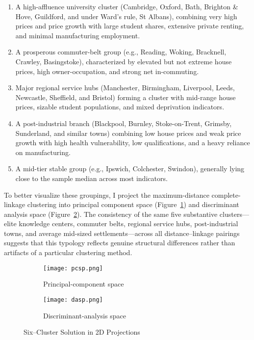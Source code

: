 \documentclass[12pt]{article}
\begin{document}
\begin{enumerate}
    \item A high-affluence university cluster (Cambridge, Oxford, Bath, Brighton \& Hove, Guildford, and under Ward’s rule, St Albans), combining very high prices and price growth with large student shares, extensive private renting, and minimal manufacturing employment.  
    \item A prosperous commuter-belt group (e.g., Reading, Woking, Bracknell, Crawley, Basingstoke), characterized by elevated but not extreme house prices, high owner-occupation, and strong net in-commuting.  
    \item Major regional service hubs (Manchester, Birmingham, Liverpool, Leeds, Newcastle, Sheffield, and Bristol) forming a cluster with mid-range house prices, sizable student populations, and mixed deprivation indicators.  
    \item A post-industrial branch (Blackpool, Burnley, Stoke-on-Trent, Grimsby, Sunderland, and similar towns) combining low house prices and weak price growth with high health vulnerability, low qualifications, and a heavy reliance on manufacturing. 
    \item A mid-tier stable group (e.g., Ipswich, Colchester, Swindon), generally lying close to the sample median across most indicators.
\end{enumerate}

To better visualize these groupings, I project the maximum-distance complete-linkage clustering into principal component space (Figure~\ref{fig:pcspace}) and discriminant analysis space (Figure~\ref{fig:daspace}). The consistency of the same five substantive clusters—elite knowledge centers, commuter belts, regional service hubs, post-industrial towns, and average mid-sized settlements—across all distance–linkage pairings suggests that this typology reflects genuine structural differences rather than artifacts of a particular clustering method.

\begin{figure}[htbp]
    \centering
    \begin{subfigure}[b]{0.49\textwidth}
        \centering
        \texttt{[image: pcsp.png]}
        \caption{Principal-component space\label{fig:pcspace}}
    \end{subfigure}
    \begin{subfigure}[b]{0.49\textwidth}
        \centering
        \texttt{[image: dasp.png]}
        \caption{Discriminant-analysis space\label{fig:daspace}}
    \end{subfigure}
    \caption{Six–Cluster Solution in 2D Projections}
    \label{fig:cluster_spaces}
\end{figure}
\end{document}
